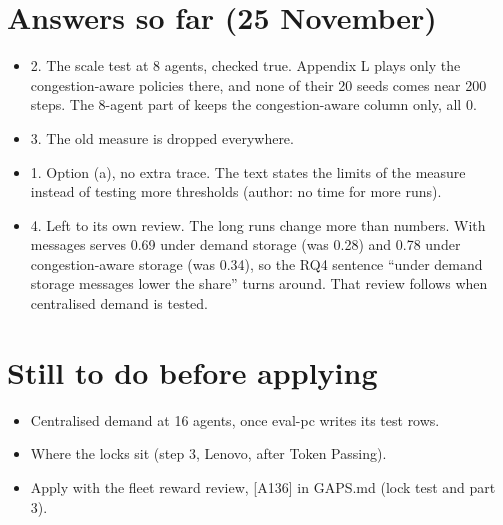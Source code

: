 \documentclass[11pt,a4paper]{article}
\newcommand{\lab}[1]{\textsf{\footnotesize\detokenize{#1}}}
\begin{document}
\section*{Answers so far (25 November)}
\begin{itemize}[nosep]
  \item 2. The scale test at 8 agents, checked true. Appendix L plays only
    the congestion-aware policies there, and none of their 20 seeds comes
    near 200 steps. The 8-agent part of \lab{tab:app:locks} keeps the
    congestion-aware column only, all 0.
  \item 3. The old measure is dropped everywhere.
  \item 1. Option (a), no extra trace. The text states the limits of the
    measure instead of testing more thresholds (author: no time for more
    runs).
  \item 4. Left to its own review. The long runs change more than numbers.
    With messages serves 0.69 under demand storage (was 0.28) and 0.78 under
    congestion-aware storage (was 0.34), so the RQ4 sentence ``under demand
    storage messages lower the share'' turns around. That review follows
    when centralised demand is tested.
\end{itemize}

\section*{Still to do before applying}
\begin{itemize}[nosep]
  \item Centralised demand at 16 agents, once eval-pc writes its test rows.
  \item Where the locks sit (step 3, Lenovo, after Token Passing).
  \item Apply with the fleet reward review, [A136] in GAPS.md (lock test and
    part 3).
\end{itemize}
\end{document}
